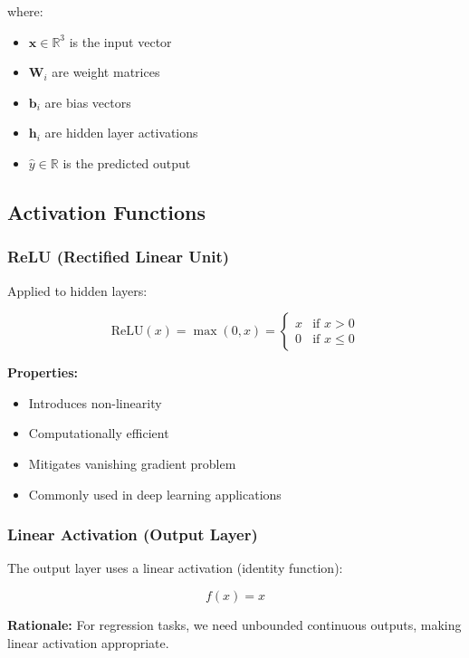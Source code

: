 \documentclass[12pt,a4paper]{article}
\begin{document}
where:
\begin{itemize}
    \item $\mathbf{x} \in \mathbb{R}^3$ is the input vector
    \item $\mathbf{W}_i$ are weight matrices
    \item $\mathbf{b}_i$ are bias vectors
    \item $\mathbf{h}_i$ are hidden layer activations
    \item $\hat{y} \in \mathbb{R}$ is the predicted output
\end{itemize}

\subsection{Activation Functions}

\subsubsection{ReLU (Rectified Linear Unit)}

Applied to hidden layers:

\begin{equation}
    \text{ReLU}(x) = \max(0, x) = \begin{cases}
        x & \text{if } x > 0 \\
        0 & \text{if } x \leq 0
    \end{cases}
\end{equation}

\textbf{Properties:}
\begin{itemize}
    \item Introduces non-linearity
    \item Computationally efficient
    \item Mitigates vanishing gradient problem
    \item Commonly used in deep learning applications
\end{itemize}

\subsubsection{Linear Activation (Output Layer)}

The output layer uses a linear activation (identity function):

\begin{equation}
    f(x) = x
\end{equation}

\textbf{Rationale:} For regression tasks, we need unbounded continuous outputs, making linear activation appropriate.
\end{document}
